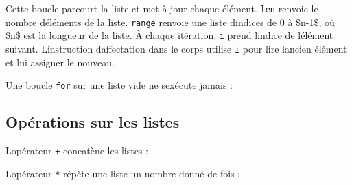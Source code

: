 Cette boucle parcourt la liste et met à jour chaque élément.
\texttt{len} renvoie le nombre d\textquotesingle éléments de la liste.
\texttt{range} renvoie une liste d\textquotesingle indices de 0 à
\$n-1\$, où \$n\$ est la longueur de la liste. À chaque itération,
\texttt{i} prend l\textquotesingle indice de l\textquotesingle élément
suivant. L\textquotesingle instruction d\textquotesingle affectation
dans le corps utilise \texttt{i} pour lire l\textquotesingle ancien
élément et lui assigner le nouveau.

Une boucle \texttt{for} sur une liste vide ne s\textquotesingle exécute
jamais :

\begin{Shaded}
\begin{Highlighting}[]
\NormalTok{ []:}
\end{Highlighting}
\end{Shaded}

\hypertarget{opuxe9rations-sur-les-listes}{%
\subsection{Opérations sur les
listes}\label{opuxe9rations-sur-les-listes}}

L\textquotesingle opérateur \texttt{+} concatène les listes :

\begin{Shaded}
\begin{Highlighting}[]
\OperatorTok{\textgreater{}\textgreater{}\textgreater{}}\OperatorTok{=}\NormalTok{ [}\NormalTok{, }\NormalTok{, }\NormalTok{]}
\OperatorTok{\textgreater{}\textgreater{}\textgreater{}}\OperatorTok{=}\NormalTok{ [}\NormalTok{, }\NormalTok{, }\NormalTok{]}
\OperatorTok{\textgreater{}\textgreater{}\textgreater{}}\OperatorTok{=}\OperatorTok{+}
\OperatorTok{\textgreater{}\textgreater{}\textgreater{}}
\NormalTok{[}\NormalTok{, }\NormalTok{, }\NormalTok{, }\NormalTok{, }\NormalTok{, }\NormalTok{]}
\end{Highlighting}
\end{Shaded}

L\textquotesingle opérateur \texttt{*} répète une liste un nombre donné
de fois :


